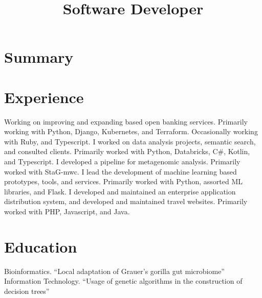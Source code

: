 \documentclass[11pt,a4paper,sans]{moderncv}
\title{Software Developer}
\begin{document}
\makecvtitle

\section{Summary}

\section{Experience}
{}{Working on improving and expanding based open banking services. \newline Primarily working with Python, Django, Kubernetes, and Terraform. Occasionally working with Ruby, and Typescript.}
{}{I worked on data analysis projects, semantic search, and consulted clients. \newline Primarily worked with Python, Databricks, C\#, Kotlin, and Typescript.}
{}{I developed a pipeline for metagenomic analysis. \newline Primarily worked with StaG-mwc.}
{}{I lead the development of machine learning based prototypes, tools, and services. \newline Primarily worked with Python, assorted ML libraries, and Flask.}
{}{I developed and maintained an enterprise application distribution system, and developed and maintained travel websites. \newline Primarily worked with PHP, Javascript, and Java.}

\section{Education}
{}{Bioinformatics. \newline “Local adaptation of Grauer’s gorilla gut microbiome”}
{}{Information Technology. \newline “Usage of genetic algorithms in the construction of decision trees”}
\end{document}
